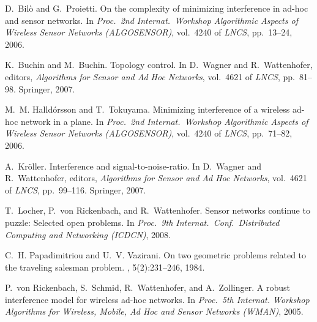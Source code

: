 \documentclass{article}
\theoremstyle{plain}
\theoremstyle{definition}
\theoremstyle{remark}
\begin{document}
{\small
\begin{thebibliography}{1}

D.~Bil{\`o} and G.~Proietti.
\newblock On the complexity of minimizing interference in ad-hoc and sensor
  networks.
\newblock In {\em Proc.\ 2nd Internat.\ Workshop Algorithmic Aspects of
  Wireless Sensor Networks (ALGOSENSOR)}, vol.\ 4240 of {\em LNCS}, pp.\  13--24, 2006.

K.~Buchin and M.~Buchin.
\newblock Topology control.
\newblock In D.~Wagner and R.~Wattenhofer, editors, {\em Algorithms for Sensor
  and Ad Hoc Networks}, vol.\ 4621 of {\em LNCS}, pp.\ 81--98. Springer,
  2007.

M.~M. Halld{\'o}rsson and T.~Tokuyama.
\newblock Minimizing interference of a wireless ad-hoc network in a plane.
\newblock In {\em Proc.\ 2nd Internat.\ Workshop Algorithmic Aspects of
  Wireless Sensor Networks (ALGOSENSOR)}, vol.\ 4240 of {\em LNCS}, pp.\
  71--82, 2006.

A.~Kr{\"o}ller.
\newblock Interference and signal-to-noise-ratio.
\newblock In D.~Wagner and R.~Wattenhofer, editors, {\em Algorithms for Sensor
  and Ad Hoc Networks}, vol.\ 4621 of {\em LNCS}, pp.\ 99--116. Springer,
  2007.

T.~Locher, P.~von Rickenbach, and R.~Wattenhofer.
\newblock Sensor networks continue to puzzle: Selected open problems.
\newblock In {\em Proc.\ 9th Internat.\ Conf.\ Distributed Computing and
  Networking (ICDCN)}, 2008.

C.~H. Papadimitriou and U.~V. Vazirani.
\newblock On two geometric problems related to the traveling salesman problem.
\newblock {\em J. Algorithms}, 5(2):231--246, 1984.

P.~von Rickenbach, S.~Schmid, R.~Wattenhofer, and A.~Zollinger.
\newblock A robust interference model for wireless ad-hoc networks.
\newblock In {\em Proc.\ 5th Internat. Workshop Algorithms for Wireless,
  Mobile, Ad Hoc and Sensor Networks (WMAN)}, 2005.

\end{thebibliography}
}
\end{document}
